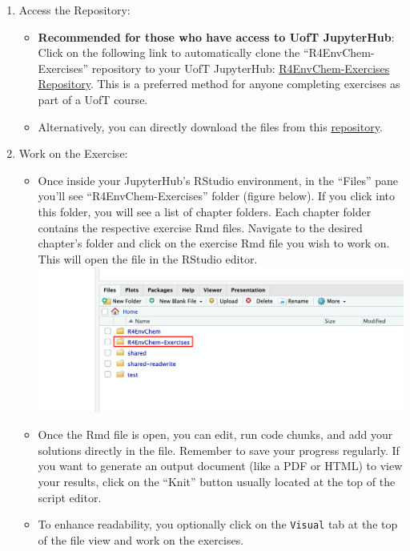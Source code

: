 \documentclass[
]{book}
\providecommand{\tightlist}{%
  \setlength{\itemsep}{0pt}\setlength{\parskip}{0pt}}
\begin{document}
\begin{enumerate}
\def\labelenumi{\arabic{enumi}.}
\tightlist
\item
  Access the Repository:

  \begin{itemize}
  \tightlist
  \item
    \textbf{Recommended for those who have access to UofT JupyterHub}: Click on the following link to automatically clone the ``R4EnvChem-Exercises'' repository to your UofT JupyterHub:
    \href{https://r.datatools.utoronto.ca/hub/user-redirect/git-pull?repo=https\%3A\%2F\%2Fgithub.com\%2FUofTChem-Teaching\%2FR4EnvChem-Exercises\&urlpath=rstudio\%2F}{R4EnvChem-Exercises Repository}. This is a preferred method for anyone completing exercises as part of a UofT course.
  \item
    Alternatively, you can directly download the files from this \href{https://github.com/UofTChem-Teaching/R4EnvChem-Exercises}{repository}.
  \end{itemize}
\item
  Work on the Exercise:

  \begin{itemize}
  \tightlist
  \item
    Once inside your JupyterHub's RStudio environment, in the ``Files'' pane you'll see ``R4EnvChem-Exercises'' folder (figure below). If you click into this folder, you will see a list of chapter folders. Each chapter folder contains the respective exercise Rmd files. Navigate to the desired chapter's folder and click on the exercise Rmd file you wish to work on. This will open the file in the RStudio editor.
    \includegraphics{images/gitpuller.png}
  \item
    Once the Rmd file is open, you can edit, run code chunks, and add your solutions directly in the file. Remember to save your progress regularly. If you want to generate an output document (like a PDF or HTML) to view your results, click on the ``Knit'' button usually located at the top of the script editor.
  \item
    To enhance readability, you optionally click on the \texttt{Visual} tab at the top of the file view and work on the exercises.
  \end{itemize}
\end{enumerate}
\end{document}
